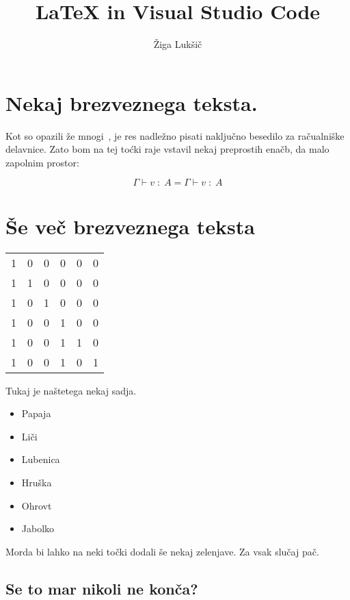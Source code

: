 \documentclass{article}
\title{LaTeX in Visual Studio Code}
\author{Žiga Lukšič}
\newcommand{\todo}[1]{{\color{red}{#1}}}
\newcommand{\ctx}{\Gamma}
\newcommand{\oftype}{\;:\;}
\newcommand{\tyA}{A}
\newcommand{\judgement}[3][\ctx]{#1 \vdash #2 \oftype #3}
\begin{document}
\maketitle

\section{Nekaj brezveznega teksta.}

Kot so opazili že mnogi~\cite{DBLP:journals/entcs/Pretnar15,DBLP:journals/jlp/BauerP15}, je res nadležno pisati naključno besedilo za račualniške delavnice. Zato bom na tej toćki raje vstavil nekaj preprostih enačb, da malo zapolnim prostor:

\[
  \judgement{v}{\tyA} = \judgement[\ctx]{v}{\tyA}
\]

\section{Še več brezveznega teksta}

\begin{tabular}{c|c|c|c|c|c}
  1 & 0 & 0 & 0 & 0 & 0 \\
  1 & 1 & 0 & 0 & 0 & 0 \\
  1 & 0 & 1 & 0 & 0 & 0 \\
  1 & 0 & 0 & 1 & 0 & 0 \\
  1 & 0 & 0 & 1 & 1 & 0 \\
  1 & 0 & 0 & 1 & 0 & 1 \\
\end{tabular}

Tukaj je naštetega nekaj sadja.

\begin{itemize}
  \item Papaja
  \item Liči
  \item Lubenica
  \item Hruška
  \item Ohrovt \todo{(???)}
  \item Jabolko
\end{itemize}

Morda bi lahko na neki točki dodali še nekaj zelenjave. Za vsak slučaj pač.

\newpage

\subsection{Se to mar nikoli ne konča?}
\end{document}
